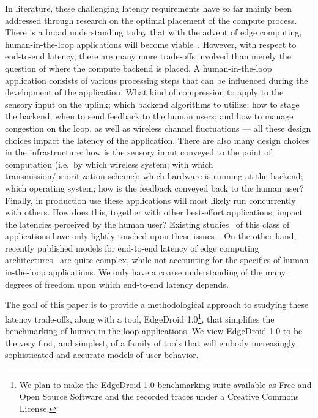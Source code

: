 In literature, these challenging latency requirements have so far mainly been addressed through research on the optimal placement of the compute process.
There is a broad understanding today that with the advent of edge computing, human-in-the-loop applications will become viable~\cite{Bittmann_Edge,flinn2012cyber,Chen:AnEmpiricalStudyOfLatency,Ha:JITProvisioning}.
However, with respect to end-to-end latency, there are many more trade-offs involved than merely the question of where the compute backend is placed.
A human-in-the-loop application consists of various processing steps that can be influenced during the development of the application.
What kind of compression to apply to the sensory input on the uplink; which backend algorithms to utilize; how to stage the backend; when to send feedback to the human users; and how to manage congestion on the loop, as well as wireless channel fluctuations --- all these design choices impact the latency of the application.
There are also many design choices in the infrastructure: how is the sensory input conveyed to the point of computation (i.e.\ by which wireless system; with which transmission/prioritization scheme); which hardware is running at the backend; which operating system; how is the feedback conveyed back to the human user?
Finally, in production use these applications will most likely run concurrently with others.
How does this, together with other best-effort applications, impact the latencies perceived by the human user?
Existing studies~\cite{Ha:TowardsWearableCogAssist, Chen:EarlyImplementation, satya2009case,Chatzopoulos:Hyperion} of this class of applications have only lightly touched upon these issues~\cite{Chen:AnEmpiricalStudyOfLatency}.
On the other hand, recently published models for end-to-end latency of edge computing architectures~\cite{Zubaidy15,Schiessl17} are quite complex, while not accounting for the specifics of human-in-the-loop applications.
We only have a coarse understanding of the many degrees of freedom upon which end-to-end latency depends.

The goal of this paper is to provide a methodological approach to studying these latency trade-offs, along with a tool, EdgeDroid 1.0\footnote{We plan to make the EdgeDroid 1.0 benchmarking suite available as Free and Open Source Software and the recorded traces under a Creative Commons License.}, that simplifies the benchmarking of human-in-the-loop applications.
We view EdgeDroid 1.0 to be the very first, and simplest, of a family of tools that will embody increasingly sophisticated and accurate models of user behavior.

